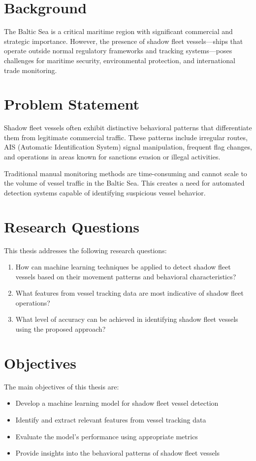 
\section{Background}
The Baltic Sea is a critical maritime region with significant commercial and strategic importance. However, the presence of shadow fleet vessels—ships that operate outside normal regulatory frameworks and tracking systems—poses challenges for maritime security, environmental protection, and international trade monitoring.

\section{Problem Statement}
Shadow fleet vessels often exhibit distinctive behavioral patterns that differentiate them from legitimate commercial traffic. These patterns include irregular routes, AIS (Automatic Identification System) signal manipulation, frequent flag changes, and operations in areas known for sanctions evasion or illegal activities.

Traditional manual monitoring methods are time-consuming and cannot scale to the volume of vessel traffic in the Baltic Sea. This creates a need for automated detection systems capable of identifying suspicious vessel behavior.

\section{Research Questions}
This thesis addresses the following research questions:
\begin{enumerate}
    \item How can machine learning techniques be applied to detect shadow fleet vessels based on their movement patterns and behavioral characteristics?
    \item What features from vessel tracking data are most indicative of shadow fleet operations?
    \item What level of accuracy can be achieved in identifying shadow fleet vessels using the proposed approach?
\end{enumerate}

\section{Objectives}
The main objectives of this thesis are:
\begin{itemize}
    \item Develop a machine learning model for shadow fleet vessel detection
    \item Identify and extract relevant features from vessel tracking data
    \item Evaluate the model's performance using appropriate metrics
    \item Provide insights into the behavioral patterns of shadow fleet vessels
\end{itemize}

